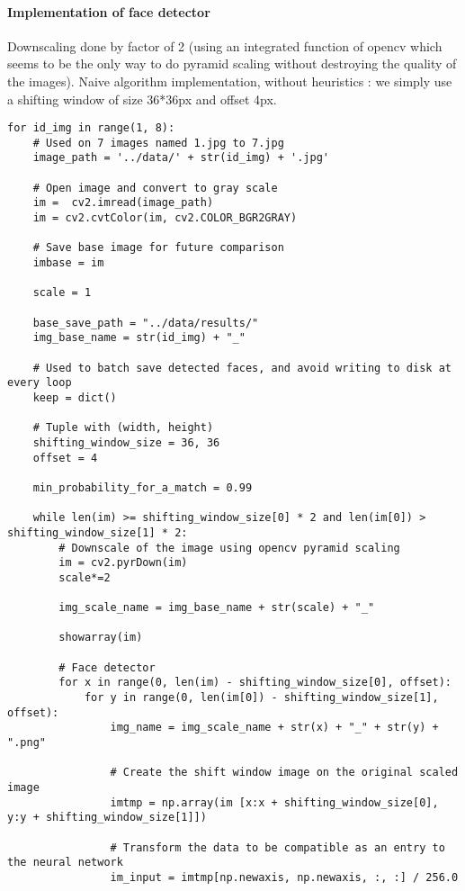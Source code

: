 \documentclass[french]{article}
\begin{document}
\paragraph{Implementation of face detector} Downscaling done by factor of 2 (using an integrated function of opencv which seems to be the only way to do pyramid scaling without destroying the quality of the images). Naive algorithm implementation, without heuristics : we simply use a shifting window of size 36*36px and offset 4px.

\begin{verbatim}
for id_img in range(1, 8):
    # Used on 7 images named 1.jpg to 7.jpg
    image_path = '../data/' + str(id_img) + '.jpg'
    
    # Open image and convert to gray scale
    im =  cv2.imread(image_path)
    im = cv2.cvtColor(im, cv2.COLOR_BGR2GRAY)
    
    # Save base image for future comparison
    imbase = im
    
    scale = 1
    
    base_save_path = "../data/results/"
    img_base_name = str(id_img) + "_"
    
    # Used to batch save detected faces, and avoid writing to disk at every loop
    keep = dict()
    
    # Tuple with (width, height)
    shifting_window_size = 36, 36
    offset = 4
    
    min_probability_for_a_match = 0.99
    
    while len(im) >= shifting_window_size[0] * 2 and len(im[0]) > shifting_window_size[1] * 2:
        # Downscale of the image using opencv pyramid scaling
        im = cv2.pyrDown(im)
        scale*=2
        
        img_scale_name = img_base_name + str(scale) + "_"
        
        showarray(im)
        
        # Face detector
        for x in range(0, len(im) - shifting_window_size[0], offset):
            for y in range(0, len(im[0]) - shifting_window_size[1], offset):
                img_name = img_scale_name + str(x) + "_" + str(y) + ".png"
                
                # Create the shift window image on the original scaled image 
                imtmp = np.array(im [x:x + shifting_window_size[0], y:y + shifting_window_size[1]])
                
                # Transform the data to be compatible as an entry to the neural network
                im_input = imtmp[np.newaxis, np.newaxis, :, :] / 256.0
                

\end{verbatim}
\end{document}
